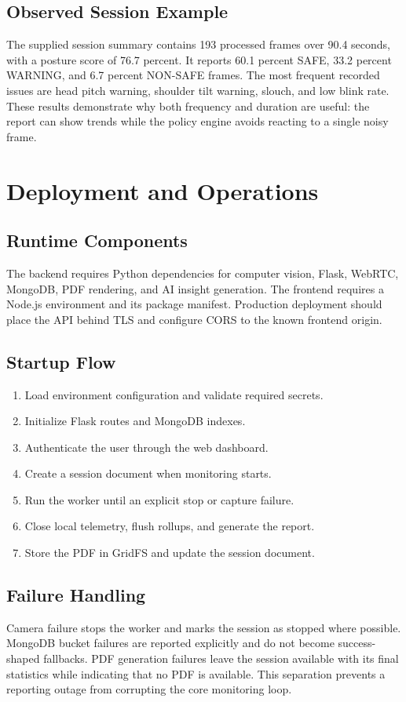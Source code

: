 \documentclass[12pt,a4paper]{report}
\begin{document}
\section{Observed Session Example}
The supplied session summary contains 193 processed frames over 90.4 seconds,
with a posture score of 76.7 percent. It reports 60.1 percent SAFE, 33.2
percent WARNING, and 6.7 percent NON-SAFE frames. The most frequent recorded
issues are head pitch warning, shoulder tilt warning, slouch, and low blink
rate. These results demonstrate why both frequency and duration are useful:
the report can show trends while the policy engine avoids reacting to a
single noisy frame.

\chapter{Deployment and Operations}
\section{Runtime Components}
The backend requires Python dependencies for computer vision, Flask, WebRTC,
MongoDB, PDF rendering, and AI insight generation. The frontend requires a
Node.js environment and its package manifest. Production deployment should
place the API behind TLS and configure CORS to the known frontend origin.

\section{Startup Flow}
\begin{enumerate}
    \item Load environment configuration and validate required secrets.
    \item Initialize Flask routes and MongoDB indexes.
    \item Authenticate the user through the web dashboard.
    \item Create a session document when monitoring starts.
    \item Run the worker until an explicit stop or capture failure.
    \item Close local telemetry, flush rollups, and generate the report.
    \item Store the PDF in GridFS and update the session document.
\end{enumerate}

\section{Failure Handling}
Camera failure stops the worker and marks the session as stopped where
possible. MongoDB bucket failures are reported explicitly and do not become
success-shaped fallbacks. PDF generation failures leave the session available
with its final statistics while indicating that no PDF is available. This
separation prevents a reporting outage from corrupting the core monitoring
loop.
\end{document}
